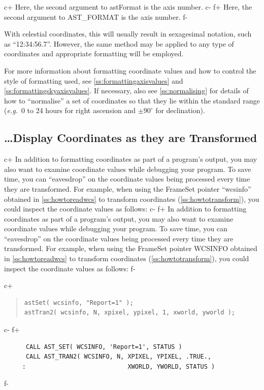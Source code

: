 \documentclass[twoside,11pt]{article}
\newcommand{\secref}[1]{\S\ref{#1}}
\renewcommand{\secref}[1]{\ref{#1}}
\begin{document}
c+
Here, the second argument to astFormat is the axis number.
c-
f+
Here, the second argument to AST\_FORMAT is the axis number.
f-

With celestial coordinates, this will usually result in sexagesimal
notation, such as ``12:34:56.7''. However, the same method may be
applied to any type of coordinates and appropriate formatting will be
employed.

For more information about formatting coordinate values and how to
control the style of formatting used, see
\secref{ss:formattingaxisvalues} and
\secref{ss:formattingskyaxisvalues}. If necessary, also see
\secref{ss:normalising} for details of how to ``normalise'' a set of
coordinates so that they lie within the standard range ({\em{e.g.}}\ 0
to 24 hours for right ascension and $\pm 90^\circ$ for
declination).

\subsection{\ldots Display Coordinates as they are Transformed}

c+
In addition to formatting coordinates as part of a program's output,
you may also want to examine coordinate values while debugging your
program. To save time, you can ``eavesdrop'' on the coordinate values
being processed every time they are transformed. For example, when
using the FrameSet pointer ``wcsinfo'' obtained in
\secref{ss:howtoreadwcs} to transform coordinates
(\secref{ss:howtotransform}), you could inspect the coordinate values
as follows:
c-
f+
In addition to formatting coordinates as part of a program's output,
you may also want to examine coordinate values while debugging your
program. To save time, you can ``eavesdrop'' on the coordinate values
being processed every time they are transformed. For example, when
using the FrameSet pointer WCSINFO obtained in
\secref{ss:howtoreadwcs} to transform coordinates
(\secref{ss:howtotransform}), you could inspect the coordinate values
as follows:
f-

c+
\begin{quote}
\small
\begin{verbatim}
astSet( wcsinfo, "Report=1" );
astTran2( wcsinfo, N, xpixel, ypixel, 1, xworld, yworld );
\end{verbatim}
\normalsize
\end{quote}
c-
f+
\small
\begin{verbatim}
      CALL AST_SET( WCSINFO, 'Report=1', STATUS )
      CALL AST_TRAN2( WCSINFO, N, XPIXEL, YPIXEL, .TRUE.,
     :                            XWORLD, YWORLD, STATUS )
\end{verbatim}
\normalsize
f-
\end{document}
